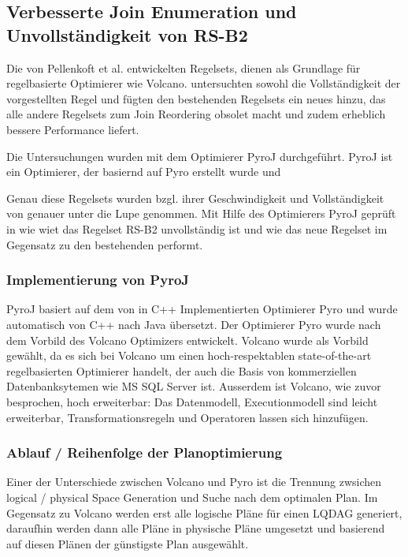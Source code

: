 \subsection{Verbesserte Join Enumeration und Unvollständigkeit von RS-B2}

Die von Pellenkoft et al. entwickelten Regelsets, dienen als Grundlage für regelbasierte Optimierer wie Volcano. \cite{shanbhag2014optimizing} untersuchten sowohl die Vollständigkeit der vorgestellten Regel und fügten den bestehenden Regelsets ein neues hinzu, das alle andere Regelsets zum Join Reordering obsolet macht und zudem erheblich bessere Performance liefert.

Die Untersuchungen wurden mit dem Optimierer PyroJ durchgeführt. PyroJ ist ein Optimierer, der basiernd auf Pyro \cite{roy2001multi} erstellt wurde und 

 Genau diese Regelsets wurden bzgl. ihrer Geschwindigkeit und Vollständigkeit von \cite{shanbhag2014optimizing} genauer unter die Lupe genommen. Mit Hilfe des Optimierers PyroJ \cite{roy2001multi} geprüft in wie wiet das Regelset RS-B2 unvollständig ist und wie das neue Regelset im Gegensatz zu den bestehenden performt.

\subsubsection{Implementierung von PyroJ}

PyroJ basiert auf dem von \cite{roy2001multi} in C++ Implementierten Optimierer Pyro und wurde automatisch von C++ nach Java übersetzt. Der Optimierer Pyro wurde nach dem Vorbild des Volcano Optimizers entwickelt. Volcano wurde als Vorbild gewählt, da es sich bei Volcano um einen hoch-respektablen state-of-the-art regelbasierten Optimierer handelt, der auch die Basis von kommerziellen Datenbanksytemen wie MS SQL Server ist. Ausserdem ist Volcano, wie zuvor besprochen, hoch erweiterbar: Das Datenmodell, Executionmodell sind leicht erweiterbar, Transformationsregeln und Operatoren lassen sich hinzufügen. 

\subsubsection{Ablauf / Reihenfolge der Planoptimierung}
Einer der Unterschiede zwischen Volcano und Pyro ist die Trennung zwsichen logical / physical Space Generation und Suche nach dem optimalen Plan. Im Gegensatz zu Volcano werden erst alle logische Pläne für einen LQDAG generiert, daraufhin werden dann alle Pläne in physische Pläne umgesetzt und basierend auf diesen Plänen der günstigste Plan ausgewählt.

